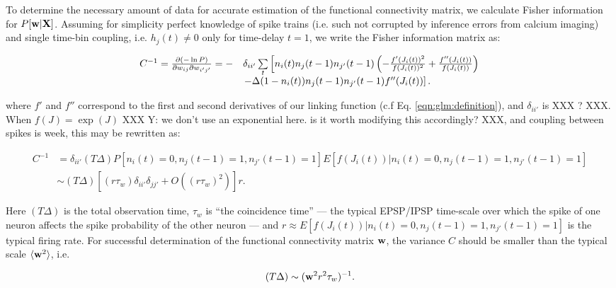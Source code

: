 To determine the necessary amount of data for accurate estimation of the functional connectivity matrix, we calculate Fisher information for $P[\mathbf{w}| {\bf X}]$. Assuming for simplicity perfect knowledge of spike trains (i.e. such not corrupted by inference errors from calcium imaging) and single time-bin coupling, i.e. $h_{j}(t)\neq 0$ only for time-delay $t=1$, we write the Fisher information matrix as:

\begin{equation}
\begin{array}{rl}
C^{-1}=\frac{\partial (-\ln P)}{\partial w_{ij}\partial w_{i'j'}}
=-&\delta_{ii'}\sum\limits_t\left[
n_i(t)n_{j}(t-1)n_{j'}(t-1)\left(-\frac{f'(J_i(t))^2}{f(J_i(t))^2} +
\frac{f''(J_i(t))}{f(J_i(t))}\right) \right. \\
&\left.-\Delta (1-n_i(t))n_{j}(t-1)n_{j'}(t-1)f''(J_i(t))\right].
\end{array}
\end{equation}

\noindent where $f'$ and $f''$ correspond to the first and second derivatives of our linking function (c.f Eq. \eqref{eqn:glm:definition}), and $\delta_{ii'}$ is XXX ? XXX.  When $f(J)=\exp(J)$ XXX Y: we don't use an exponential here.  is it worth modifying this accordingly? XXX, and coupling between spikes is week, this may be rewritten as:

\begin{equation}\label{eqn:fisher}
\begin{array}{rl}
C^{-1}
&=\delta_{ii'} (T\Delta) P[n_i(t)=0, n_j(t-1)=1, n_{j'}(t-1)=1]E[f(J_i(t))|n_i(t)=0, n_j(t-1)=1, n_{j'}(t-1)=1] \\
&\sim (T\Delta)\left[(r \tau_w)\delta_{ii'}\delta_{jj'}+O((r \tau_w)^2)\right]r.
\end{array}
\end{equation}

Here $(T\Delta)$ is the total observation time, $ \tau_w$ is ``the coincidence time'' --- the typical EPSP/IPSP time-scale over which the spike of one neuron affects the spike probability of the other neuron --- and $r \approx E[f(J_i(t))|n_i(t)=0, n_j(t-1)=1, n_{j'}(t-1)=1]$ is the typical firing rate.  For successful determination of the functional connectivity matrix $\mathbf{w}$, the variance $C$ should be smaller than the typical scale $\langle \mathbf{w}^2\rangle$, i.e.

\begin{equation}
(T\Delta) \sim (\mathbf{w}^2 r^2  \tau_w)^{-1}.
\end{equation}

